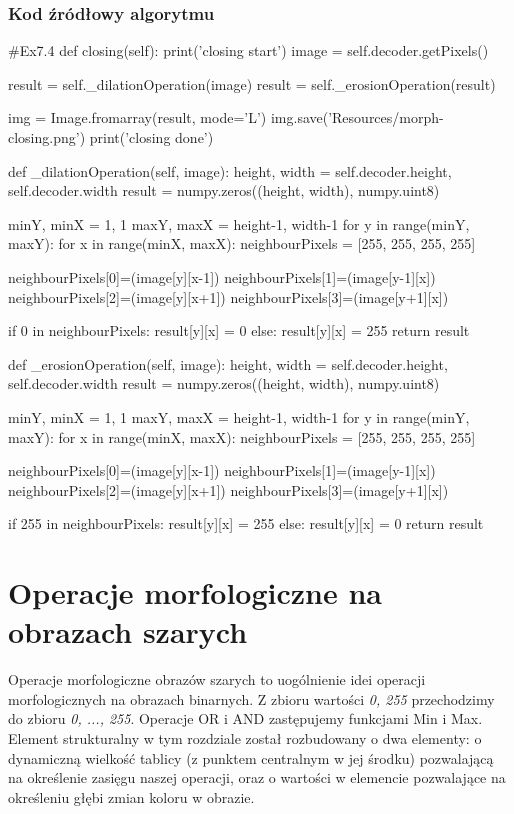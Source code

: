 \documentclass[a4paper,12pt]{book}
\begin{document}
\subsection{Kod źródłowy algorytmu}
\begin{python}
#Ex7.4
def closing(self):
	print('closing start')
	image = self.decoder.getPixels()
	
	result = self._dilationOperation(image)
	result = self._erosionOperation(result)
	
	img = Image.fromarray(result, mode='L')
	img.save('Resources/morph-closing.png')
	print('closing done')
	
def _dilationOperation(self, image):
	height, width = self.decoder.height, self.decoder.width
	result = numpy.zeros((height, width), numpy.uint8)
	
	minY, minX = 1, 1
	maxY, maxX = height-1, width-1
	for y in range(minY, maxY):
		for x in range(minX, maxX):
			neighbourPixels = [255, 255, 255, 255]
			
			neighbourPixels[0]=(image[y][x-1])
			neighbourPixels[1]=(image[y-1][x])
			neighbourPixels[2]=(image[y][x+1])
			neighbourPixels[3]=(image[y+1][x])
			
			if 0 in neighbourPixels:
				result[y][x] = 0
			else:
				result[y][x] = 255
	return result
	
def _erosionOperation(self, image):
	height, width = self.decoder.height, self.decoder.width
	result = numpy.zeros((height, width), numpy.uint8)
	
	minY, minX = 1, 1
	maxY, maxX = height-1, width-1
	for y in range(minY, maxY):
		for x in range(minX, maxX):
			neighbourPixels = [255, 255, 255, 255]
			
			neighbourPixels[0]=(image[y][x-1])
			neighbourPixels[1]=(image[y-1][x])
			neighbourPixels[2]=(image[y][x+1])
			neighbourPixels[3]=(image[y+1][x])
			
			if 255 in neighbourPixels:
				result[y][x] = 255
			else:
				result[y][x] = 0
	return result
\end{python}

\chapter{Operacje morfologiczne na obrazach szarych}
Operacje morfologiczne obrazów szarych to uogólnienie idei operacji morfologicznych na obrazach binarnych. Z zbioru wartości \textit{0, 255} przechodzimy do zbioru \textit{0, ..., 255}. Operacje OR i AND zastępujemy funkcjami Min i Max. Element strukturalny w tym rozdziale został rozbudowany o dwa elementy: o dynamiczną wielkość tablicy (z punktem centralnym w jej środku) pozwalającą na określenie zasięgu naszej operacji, oraz o wartości w elemencie pozwalające na określeniu głębi zmian koloru w obrazie. 
\end{document}
